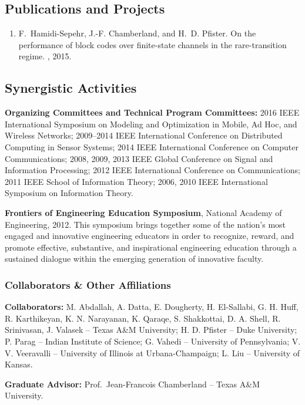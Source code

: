 \documentclass[11pt]{article}
\begin{document}
\subsection*{Publications and Projects}

\begin{enumerate}    \itemsep0pt
\item F.~Hamidi-Sepehr, J.-F. Chamberland, and H.~D. Pfister.
\newblock On the performance of block codes over finite-state channels in the
  rare-transition regime.
, 2015.
\end{enumerate}


\subsection*{Synergistic Activities}

\textbf{Organizing Committees and Technical Program Committees:}
2016 IEEE International Symposium on Modeling and Optimization in Mobile, Ad Hoc, and Wireless Networks;
2009--2014 IEEE International Conference on Distributed Computing in Sensor Systems;
2014 IEEE International Conference on Computer Communications;
2008, 2009, 2013 IEEE Global Conference on Signal and Information Processing;
2012 IEEE International Conference on Communications;
2011 IEEE School of Information Theory;
2006, 2010 IEEE International Symposium on Information Theory.

\textbf{Frontiers of Engineering Education Symposium}, National Academy of Engineering, 2012.
This symposium brings together some of the nation's most engaged and innovative engineering educators in order to recognize, reward, and promote effective, substantive, and inspirational engineering education through a sustained dialogue within the emerging generation of innovative faculty.


\subsubsection*{Collaborators \& Other Affiliations}

\textbf{Collaborators:}
M. Abdallah,
A. Datta,
E. Dougherty,
H. El-Sallabi,
G. H. Huff,
R. Karthikeyan,
K. N. Narayanan,
K. Qaraqe,
S. Shakkottai,
D. A. Shell,
R. Srinivasan,
J. Valasek
-- Texas A\&M University;
H. D. Pfister -- Duke University;
P. Parag -- Indian Institute of Science;
G. Vahedi -- University of Pennsylvania;
V. V. Veeravalli -- University of Illinois at Urbana-Champaign;
L. Liu -- University of Kansas.

\textbf{Graduate Advisor:}
Prof.~Jean-Francois Chamberland -- Texas A\&M University.
\end{document}
